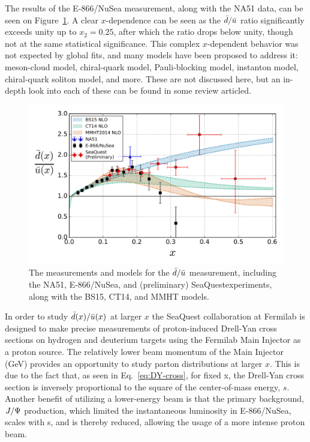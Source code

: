 The results of the E-866/NuSea measurement\cite{PhysRevLett.80.3715}, along with the NA51 data, can be seen on Figure~\ref{fig:dbar-ubar}. A clear $x$-dependence can be seen as the $\bar{d}/\bar{u}$ ratio significantly exceeds unity up to $x_2=0.25$, after which the ratio drops below unity, though not at the same statistical significance. This complex $x$-dependent behavior was not expected by global fits, and many models have been proposed to address it: meson-cloud model, chiral-quark model, Pauli-blocking model, instanton model, chiral-quark soliton model, and more. These are not discussed here, but an in-depth look into each of these can be found in some review articled\cite{Kumano:1997cy, Garvey:2001yq}.

\begin{figure}
	\centering
	\includegraphics[width=\textwidth]{figures/background/dbar_ubar.png}
	\caption{The measurements and models for the $\bar{d}/\bar{u}$ measurement, including the NA51\cite{Baldit:1994jk}, E-866/NuSea\cite{PhysRevLett.80.3715}, and (preliminary) SeaQuest\CN experiments, along with the BS15, CT14, and MMHT models.}
	\label{fig:dbar-ubar}
\end{figure}

In order to study $\bar{d}(x)/\bar{u}(x)$ at larger $x$ the SeaQuest collaboration at Fermilab is designed to make precise measurements of proton-induced Drell-Yan cross sections on hydrogen and deuterium targets using the Fermilab Main Injector as a proton source. The relatively lower beam momentum of the Main Injector (\unit[120]{GeV}) provides an opportunity to study parton distributions at larger $x$. This is due to the fact that, as seen in Eq.~\ref{eq:DY-cross}, for fixed x, the Drell-Yan cross section is inversely proportional to the square of the center-of-mass energy, $s$. Another benefit of utilizing a lower-energy beam is that the primary background, $J/\Psi$ production, which limited the instantaneous luminosity in E-866/NuSea, scales with s, and is thereby reduced, allowing the usage of a more intense proton beam.

